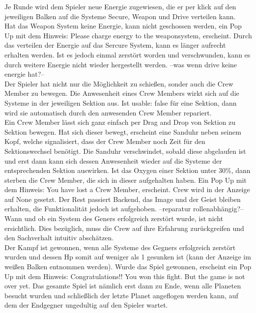 \documentclass[fontsize=12pt,paper=a4,twoside]{scrartcl}
\begin{document}
Je Runde wird dem Spieler neue Energie zugewiesen, die er per klick auf den jeweiligen Balken auf die Systeme Secure, Weapon und Drive
verteilen kann.\\

Hat das Weapon System keine Energie, kann nicht geschossen werden, ein Pop Up mit dem Hinweis:
Please charge energy to the weaponsystem, erscheint.
Durch das verteilen der Energie auf das Sercure System, kann es länger aufrecht erhalten werden. Ist es jedoch einmal zerstört worden und verschwunden, kann es durch weitere Energie nicht wieder hergestellt werden. --was wenn drive keine energie hat?--\\

Der Spieler hat nicht nur die Möglichkeit zu schießen, sonder auch die Crew Member zu bewegen.
Die Anwesenheit eines Crew Members wirkt sich auf die Systeme in der jeweiligen Sektion aus.
Ist usable: false für eine Sektion, dann wird sie automatisch durch den anwesenden Crew Member repariert.\\
 Ein Crew Member lässt sich ganz einfach per Drag and Drop von Sektion zu Sektion bewegen.
Hat sich dieser bewegt, erscheint eine Sanduhr neben seinem Kopf, welche signalisiert, dass der Crew Member noch Zeit für den Sektionswechsel benötigt. Die Sanduhr verschwindet, sobald diese abgelaufen ist
 und erst dann kann sich dessen Anwesenheit wieder auf die Systeme der entsprechenden Sektion auswirken. Ist das Oxygen einer Sektion unter 30\%, dann sterben die Crew Member, die sich in dieser aufgehalten haben. Ein Pop Up mit dem Hinweis: You have lost a Crew Member, erscheint. Crew wird in der Anzeige auf None gesetzt.
Der Rest passiert Backend, das Image und der Geist bleiben erhalten, die Funktionalität jedoch ist aufgehoben. --reparatur rollenabhängig?--\\

Wann und ob ein System des Geners erfolgreich zerstört wurde, ist nicht ersichtlich.
Dies bezüglich, muss die Crew auf ihre Erfahrung zurückgreifen und den Sachverhalt intuitiv abschätzen.\\

Der Kampf ist gewonnen, wenn alle Systeme des Gegners erfolgreich zerstört wurden und dessen Hp somit auf weniger als 1 gesunken ist (kann der Anzeige im weißen Balken entnommen werden).
Wurde das Spiel gewonnen, erscheint ein Pop Up mit dem Hinweis: Congratulations!! You won this fight. But 
the game is not over yet. Das gesamte Spiel ist nämlich erst dann zu Ende, wenn alle Planeten besucht wurden und schließlich der letzte Planet angeflogen werden kann, auf dem der Endgegner ungedultig auf den Spieler wartet.\\
\end{document}
